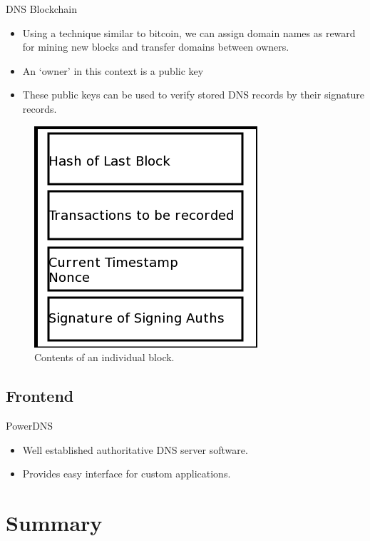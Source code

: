 \documentclass[11pt]{beamer}
\begin{document}
\begin{frame}{DNS Blockchain}
	\begin{itemize}
		\item Using a technique similar to bitcoin, we can assign domain names as reward for mining new blocks and transfer domains between owners.
		
		\item An `owner' in this context is a public key
		
		\item These public keys can be used to verify stored DNS records by their signature records.
	\end{itemize}
\end{frame}



\begin{frame}
	\begin{figure}
	\centering
	\includegraphics[width=0.4\linewidth]{namecoin_block}
	\caption{Contents of an individual block.}
	\label{fig:blockchain}
	\end{figure}

\end{frame}


\subsection{Frontend}
\begin{frame}{PowerDNS}
\begin{itemize}
	\item Well established authoritative DNS server software.
	
	\item Provides easy interface for custom applications.
	
\end{itemize}
\end{frame}

\section{Summary}
\end{document}

